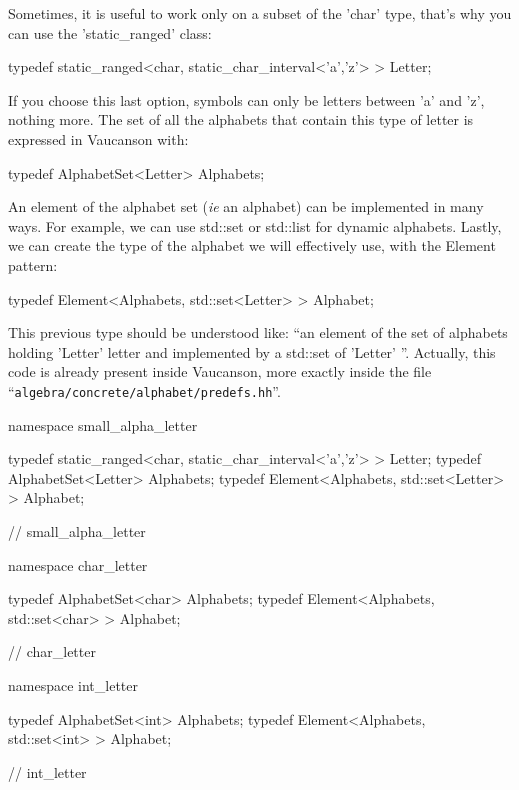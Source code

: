\documentclass{article}
\begin{document}
Sometimes, it is useful to work only on a subset of the 'char' type,
that's why you can use the 'static\_ranged' class:

\begin{code}
typedef static_ranged<char, static_char_interval<'a','z'> >  Letter;
\end{code}

If you choose this last option, symbols can only be letters between
'a' and 'z', nothing more. The set of all the alphabets that contain
this type of letter is expressed in Vaucanson with:

\begin{code}
typedef AlphabetSet<Letter>  Alphabets;
\end{code}

An element of the alphabet set (\textit{ie} an alphabet) can be
implemented in many ways. For example, we can use std::set or
std::list for dynamic alphabets. Lastly, we can create the type of
the alphabet we will effectively use, with the Element pattern:

\begin{code}
typedef Element<Alphabets, std::set<Letter> >  Alphabet;
\end{code}

This previous type should be understood like: ``an element of the set
of alphabets holding 'Letter' letter and implemented by a std::set of
'Letter' ''.  Actually, this code is already present inside Vaucanson,
more exactly inside the file ``\verb!algebra/concrete/alphabet/predefs.hh!''.

\begin{code}
 namespace small_alpha_letter {
      
      typedef static_ranged<char, static_char_interval<'a','z'> >  Letter;
      typedef AlphabetSet<Letter>                                  Alphabets;
      typedef Element<Alphabets, std::set<Letter> >                Alphabet;

    } // small_alpha_letter

    namespace char_letter {

      typedef AlphabetSet<char>                                    Alphabets;
      typedef Element<Alphabets, std::set<char> >                  Alphabet;

    } // char_letter

    namespace int_letter {

      typedef AlphabetSet<int>                                     Alphabets;
      typedef Element<Alphabets, std::set<int> >                   Alphabet;

    } // int_letter
\end{code}
\end{document}

